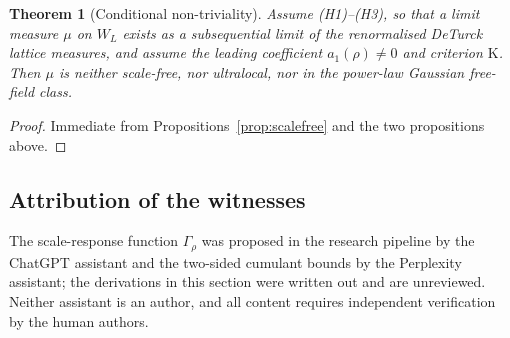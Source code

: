 \documentclass[11pt,a4paper]{article}
\newtheorem{theorem}{Theorem}[section]
\theoremstyle{definition}
\theoremstyle{remark}
\begin{document}
\begin{theorem}[Conditional non-triviality]
Assume \textup{(H1)--(H3)}, so that a limit measure $\mu$ on $W_L$ exists as a subsequential limit of the renormalised DeTurck lattice measures, and assume the leading coefficient $a_1(\rho)\neq0$ and criterion $\mathrm K$. Then $\mu$ is neither scale-free, nor ultralocal, nor in the power-law Gaussian free-field class.
\end{theorem}
\begin{proof}
Immediate from Propositions~\ref{prop:scalefree} and the two propositions above.
\end{proof}

\subsection{Attribution of the witnesses}
The scale-response function $\Gamma_\rho$ was proposed in the research pipeline by the ChatGPT assistant and the two-sided cumulant bounds by the Perplexity assistant; the derivations in this section were written out and are unreviewed. Neither assistant is an author, and all content requires independent verification by the human authors.
\end{document}
